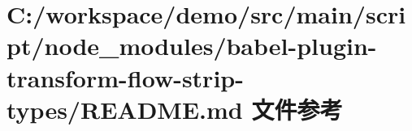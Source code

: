 \hypertarget{node__modules_2babel-plugin-transform-flow-strip-types_2_r_e_a_d_m_e_8md}{}\section{C\+:/workspace/demo/src/main/script/node\+\_\+modules/babel-\/plugin-\/transform-\/flow-\/strip-\/types/\+R\+E\+A\+D\+ME.md 文件参考}
\label{node__modules_2babel-plugin-transform-flow-strip-types_2_r_e_a_d_m_e_8md}
